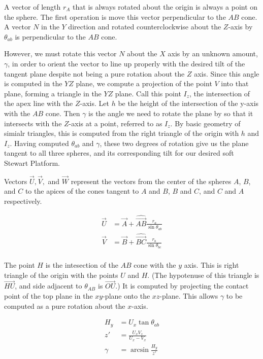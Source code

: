 \documentclass{article}
\begin{document}
A vector of length $r_A$ that is always rotated about the origin is always a point on the sphere.
The first operation is move this vector perpendicular to the $AB$ cone.
A vector $N$ in the $Y$ direction and rotated counterclockwise
about the $Z$-axis by $\theta_{ab}$ is perpendicular to the $AB$ cone.

However, we must rotate this vector $N$ about the $X$ axis by an unknown amount, $\gamma$, in order
to orient the vector to line up properly with the desired tilt of the tangent plane despite not being a pure rotation about the $Z$ axis. Since this angle is computed in the $YZ$ plane, we compute a projection of the point $V$ into
that plane, forming a triangle in the $YZ$ plane.  Call this point $I_z$, the intersection
of the apex line with the $Z$-axis. Let $h$ be the height of the intersection of the y-axis with the $AB$ cone.
Then $\gamma$ is the angle we need to rotate the plane by so that it intersects with the $Z$-axis at a point, referred to as $I_z$. By basic geometry of simialr triangles, this is computed from the right triangle of the origin with $h$ and $I_z$.
Having computed $\theta_{ab}$ and $\gamma$, these two degrees of rotation give us the plane tangent to all three spheres, and its corresponding tilt for our desired soft Stewart Platform.

Vectors $\overrightarrow{U}, \overrightarrow{V}, $ and $  \overrightarrow{W}$ represent the vectors from the center of the spheres $A$, $B$, and $C$ to
the apices of the cones tangent to $A$ and $B$, $B$ and $C$, and $C$ and $A$ respectively.


\begin{align}
  \overrightarrow{U} &= \overrightarrow{A} + \hat{\overrightarrow{AB}} \frac{r_a}{\sin{\theta_{ab}}} \\
  \overrightarrow{V} &= \overrightarrow{B} + \hat{\overrightarrow{BC}} \frac{r_b}{\sin{\theta_{bc}}} \\
\end{align}

The point $H$ is the intesection of the $AB$ cone with the $y$ axis.
This is right triangle of the origin with the points $U$ and $H$. (The hypotenuse
of this triangle is $\overrightarrow{HU}$, and side adjacent to $\theta_{AB}$ is $\overrightarrow{OU}$.)
It is computed by projecting the contact point of the top plane in the $xy$-plane
onto the $xz$-plane. This allows $\gamma$ to be computed as a pure rotation
about the $x$-axis.

\begin{align}
H_y &= U_x\tan{\theta_{ab}}\\
z' &= \frac{U_xV_z}{U_x - V_x} \\
\gamma &= \arcsin{\frac{H_y}{z'}}
\end{align}
\end{document}
